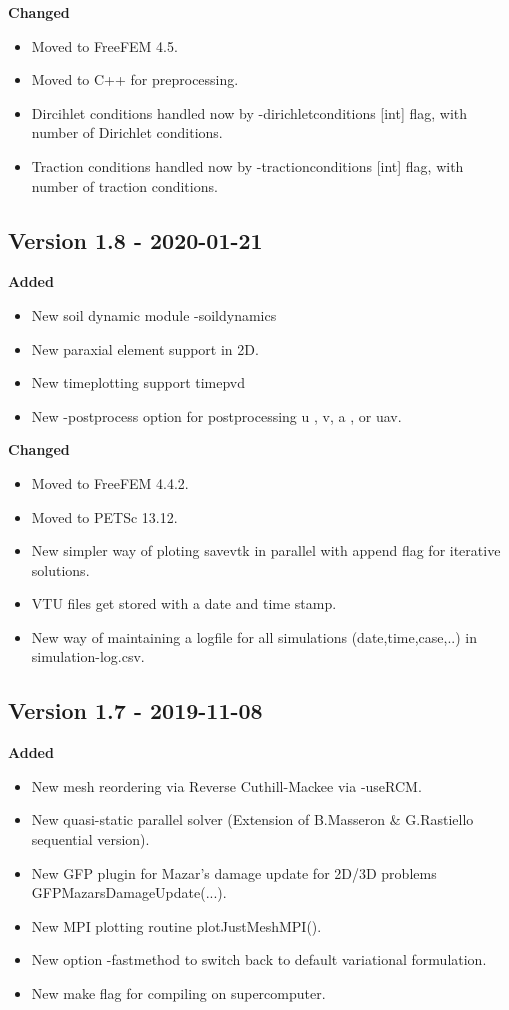 \documentclass{report}
\begin{document}
\textbf{Changed}
\begin{itemize}
\item Moved to FreeFEM 4.5.
\item Moved to C++ for preprocessing.
\item Dircihlet conditions handled now by {\ttfamily -dirichletconditions [int]} flag, with {\ttfamily  [int]} number of Dirichlet conditions.
\item Traction conditions handled now by {\ttfamily -tractionconditions [int]} flag, with {\ttfamily  [int]} number of traction conditions.

\end{itemize}

\subsection{Version 1.8 - 2020-01-21}
\textbf{Added}
\begin{itemize}
 \item New soil dynamic module {\ttfamily -soildynamics}
 \item New paraxial element support in 2D.
 \item New timeplotting support {\ttfamily timepvd}
 \item New {\ttfamily -postprocess} option for postprocessing {\ttfamily u} , {\ttfamily v},  {\ttfamily a} , or {\ttfamily uav}. 
\end{itemize}

\textbf{Changed}
\begin{itemize}
 \item Moved to FreeFEM 4.4.2.
 \item Moved to PETSc 13.12.
 \item New simpler way of ploting {\ttfamily savevtk} in parallel with {\ttfamily append} flag for iterative solutions.
 \item VTU files get stored with a date and time stamp.
 \item New way of maintaining a logfile for all simulations (date,time,case,..) in {\ttfamily simulation-log.csv}.
\end{itemize}

\subsection{Version 1.7 - 2019-11-08}

\textbf{Added}
\begin{itemize}
 \item New  mesh reordering via Reverse Cuthill-Mackee via {\ttfamily -useRCM}. 
 \item New quasi-static parallel solver (Extension of B.Masseron \& G.Rastiello sequential version).
 \item New GFP plugin for Mazar's damage update for 2D/3D problems {\ttfamily GFPMazarsDamageUpdate(...)}.
 \item New MPI plotting routine {\ttfamily plotJustMeshMPI()}.
 \item New option {\ttfamily -fastmethod} to switch back to default variational formulation.
 \item New  make flag for compiling on supercomputer. 
\end{itemize}
\end{document}
